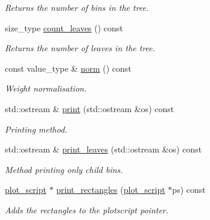 \begin{DoxyCompactItemize}
\begin{DoxyCompactList}\small\item\em Returns the number of bins in the tree. \end{DoxyCompactList}\item 
\hypertarget{a00393_a43a8e5d2e45865065735d971b2170d25}{}size\+\_\+type \hyperlink{a00393_a43a8e5d2e45865065735d971b2170d25}{count\+\_\+leaves} () const \label{a00393_a43a8e5d2e45865065735d971b2170d25}

\begin{DoxyCompactList}\small\item\em Returns the number of leaves in the tree. \end{DoxyCompactList}\item 
\hypertarget{a00393_aeaf676af11e832ff15ce59ac2f9fc08e}{}const value\+\_\+type \& \hyperlink{a00393_aeaf676af11e832ff15ce59ac2f9fc08e}{norm} () const \label{a00393_aeaf676af11e832ff15ce59ac2f9fc08e}

\begin{DoxyCompactList}\small\item\em Weight normalisation. \end{DoxyCompactList}\item 
\hypertarget{a00393_a61f410668c1c0aeb0f3ddd543a0e5c9e}{}std\+::ostream \& \hyperlink{a00393_a61f410668c1c0aeb0f3ddd543a0e5c9e}{print} (std\+::ostream \&os) const \label{a00393_a61f410668c1c0aeb0f3ddd543a0e5c9e}

\begin{DoxyCompactList}\small\item\em Printing method. \end{DoxyCompactList}\item 
\hypertarget{a00393_a77c5622cf70581b975449b05cd6cef3c}{}std\+::ostream \& \hyperlink{a00393_a77c5622cf70581b975449b05cd6cef3c}{print\+\_\+leaves} (std\+::ostream \&os) const \label{a00393_a77c5622cf70581b975449b05cd6cef3c}

\begin{DoxyCompactList}\small\item\em Method printing only child bins. \end{DoxyCompactList}\item 
\hypertarget{a00393_a00841810b511e5075aabdc1c74a1e6d7}{}\hyperlink{a00431}{plot\+\_\+script} $\ast$ \hyperlink{a00393_a00841810b511e5075aabdc1c74a1e6d7}{print\+\_\+rectangles} (\hyperlink{a00431}{plot\+\_\+script} $\ast$ps) const \label{a00393_a00841810b511e5075aabdc1c74a1e6d7}

\begin{DoxyCompactList}\small\item\em Adds the rectangles to the plotscript pointer. \end{DoxyCompactList}\end{DoxyCompactItemize}
